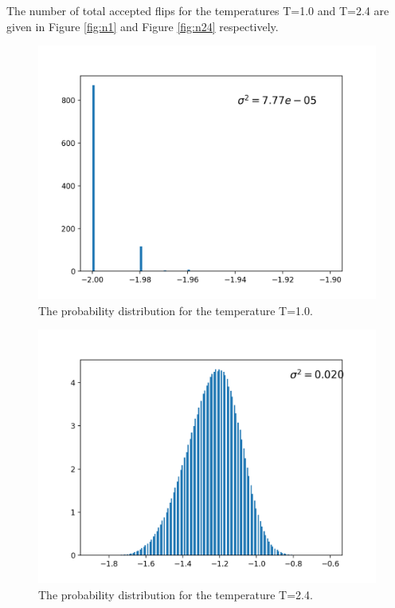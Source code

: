 \documentclass{article}
\begin{document}
\begin{multicols}{2}
The number of total accepted flips for the temperatures T=1.0 and T=2.4 are given in Figure \ref{fig:n1} and Figure \ref{fig:n24} respectively. 

\begin{figure}[H]
	\centering
	\includegraphics[width=\linewidth]{Hist_1.png}
	\caption{The probability distribution for the temperature T=1.0.}
	\label{fig:pd1}
\end{figure}

\begin{figure}[H]
	\centering
	\includegraphics[width=\linewidth]{Hist_24.png}
	\caption{The probability distribution for the temperature T=2.4.}
	\label{fig:pd24}
\end{figure}


\end{multicols}
\end{document}
